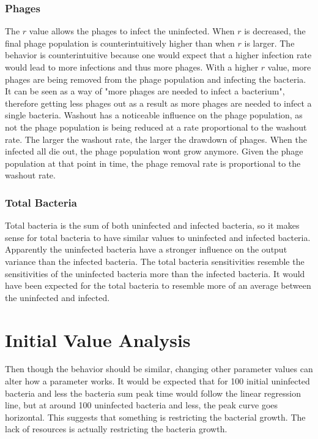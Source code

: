 \subsubsection{Phages}
The $r$ value allows the phages to infect the uninfected. 
When $r$ is decreased, the final phage population is counterintuitively higher than when $r$ is larger. 
The behavior is counterintuitive because one would expect that a higher infection rate would lead to more infections and thus more phages. 
With a higher $r$ value, more phages are being removed from the phage population and infecting the bacteria. 
It can be seen as a way of "more phages are needed to infect a bacterium", therefore getting less phages out as a result as more phages are needed to infect a single bacteria. 
Washout has a noticeable influence on the phage population, as not the phage population is being reduced at a rate proportional to the washout rate. 
The larger the washout rate, the larger the drawdown of phages. 
When the infected all die out, the phage population wont grow anymore. 
Given the phage population at that point in time, the phage removal rate is proportional to the washout rate. 

\subsubsection{Total Bacteria}
Total bacteria is the sum of both uninfected and infected bacteria, so it makes sense for total bacteria to have similar values to uninfected and infected bacteria. 
Apparently the uninfected bacteria have a stronger influence on the output variance than the infected bacteria. 
The total bacteria sensitivities resemble the sensitivities of the uninfected bacteria more than the infected bacteria. 
It would have been expected for the total bacteria to resemble more of an average between the uninfected and infected. 


\section{Initial Value Analysis}
Then though the behavior should be similar, changing other parameter values can alter how a parameter works. 
It would be expected that for 100 initial uninfected bacteria and less the bacteria sum peak time would follow the linear regression line, but at around 100 uninfected bacteria and less, the peak curve goes horizontal. 
This suggests that something is restricting the bacterial growth. 
The lack of resources is actually restricting the bacteria growth. 


